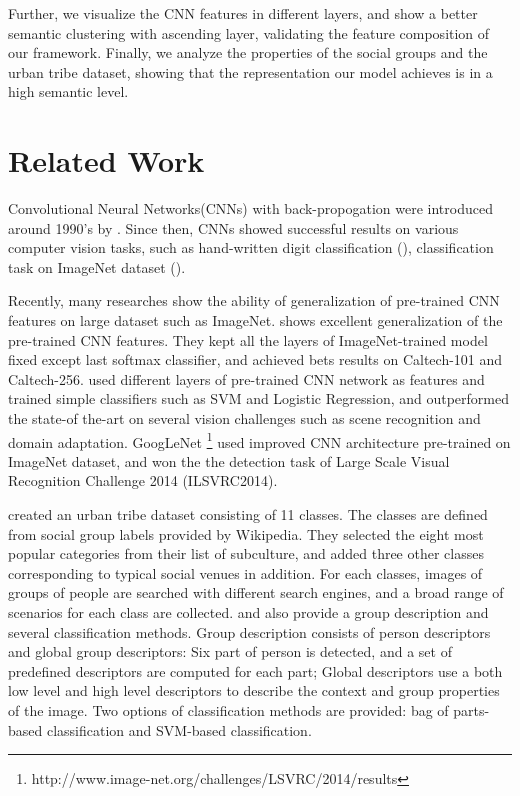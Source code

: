 \documentclass[10pt,twocolumn,letterpaper]{article}
\begin{document}
Further, we visualize the CNN features in different layers, and show a better semantic clustering with ascending layer, validating the feature composition of our framework. Finally, we analyze the properties of the social groups and the urban tribe dataset, showing that the representation our model achieves is in a high semantic level. 


\section{Related Work}
Convolutional Neural Networks(CNNs) with back-propogation were introduced around 1990's by \cite{lecun89}.  Since then, CNNs showed successful results on various computer vision tasks, such as hand-written digit classification (\cite{lecun98}), classification task on ImageNet dataset (\cite{Imagenet}). 

Recently, many researches show the ability of generalization of pre-trained CNN features on large dataset such as ImageNet. \cite{Imagenet13} shows excellent generalization of the pre-trained CNN features. They kept all the layers of ImageNet-trained model fixed except last softmax classifier, and achieved bets results on Caltech-101 and Caltech-256. \cite{decaf}  used different layers of pre-trained CNN network as features and trained simple classifiers such as SVM and Logistic Regression, and outperformed the state-of the-art on several vision challenges such as scene recognition and domain adaptation. 
GoogLeNet \footnote{http://www.image-net.org/challenges/LSVRC/2014/results} used improved CNN architecture pre-trained on ImageNet dataset, and won the the detection task of Large Scale Visual Recognition Challenge 2014 (ILSVRC2014). 

\cite{urbantribe2} created an urban tribe dataset consisting of 11 classes. The classes are defined from social group labels provided by Wikipedia. They selected the eight most popular categories from their list of subculture, and added three other classes corresponding to typical social venues  in addition. For each classes, images of groups of people are searched with different search engines, and a broad range of scenarios for each class are collected.   \cite{urbantribe} and \cite{urbantribe2} also provide a group description and several classification methods. Group description consists of person descriptors and global group descriptors: Six part of person is detected, and a set of predefined descriptors are computed for each part; Global descriptors use a both low level and high level descriptors to describe the context and group properties of the image. Two options of classification methods are provided: bag of parts-based classification and SVM-based classification.
\end{document}
